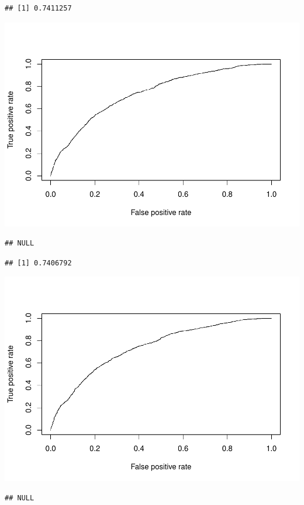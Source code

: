 \documentclass[]{article}
\begin{document}
\begin{verbatim}
## [1] 0.7411257
\end{verbatim}

\includegraphics{DATA621-Homework-4_files/figure-latex/unnamed-chunk-21-2.pdf}

\begin{verbatim}
## NULL
\end{verbatim}

\begin{verbatim}
## [1] 0.7406792
\end{verbatim}

\includegraphics{DATA621-Homework-4_files/figure-latex/unnamed-chunk-21-3.pdf}

\begin{verbatim}
## NULL
\end{verbatim}
\end{document}
